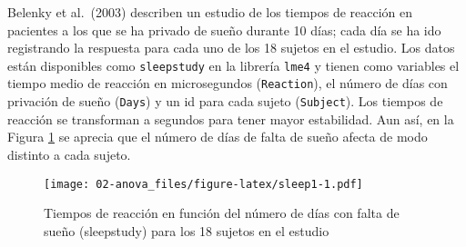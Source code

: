 \documentclass[
]{book}
\newenvironment{Shaded}{\begin{snugshade}}{\end{snugshade}}
\newcommand{\AttributeTok}[1]{\textcolor[rgb]{0.77,0.63,0.00}{#1}}
\newcommand{\CommentTok}[1]{\textcolor[rgb]{0.56,0.35,0.01}{\textit{#1}}}
\newcommand{\DecValTok}[1]{\textcolor[rgb]{0.00,0.00,0.81}{#1}}
\newcommand{\FloatTok}[1]{\textcolor[rgb]{0.00,0.00,0.81}{#1}}
\newcommand{\FunctionTok}[1]{\textcolor[rgb]{0.00,0.00,0.00}{#1}}
\newcommand{\NormalTok}[1]{#1}
\newcommand{\OtherTok}[1]{\textcolor[rgb]{0.56,0.35,0.01}{#1}}
\newcommand{\SpecialCharTok}[1]{\textcolor[rgb]{0.00,0.00,0.00}{#1}}
\newcommand{\StringTok}[1]{\textcolor[rgb]{0.31,0.60,0.02}{#1}}
\begin{document}
Belenky et al.~(2003) describen un estudio de los tiempos de reacción en pacientes a los que se ha privado de sueño durante 10 días; cada día se ha ido registrando la respuesta para cada uno de los 18 sujetos en el estudio. Los datos están disponibles como \texttt{sleepstudy} en la librería \texttt{lme4} y tienen como variables el tiempo medio de reacción en microsegundos (\texttt{Reaction}), el número de días con privación de sueño (\texttt{Days}) y un id para cada sujeto (\texttt{Subject}). Los tiempos de reacción se transforman a segundos para tener mayor estabilidad. Aun así, en la Figura \ref{fig:sleep1} se aprecia que el número de días de falta de sueño afecta de modo distinto a cada sujeto.

\begin{Shaded}
\end{Shaded}

\begin{figure}
\centering
\texttt{[image: 02-anova\_files/figure-latex/sleep1-1.pdf]}
\caption{\label{fig:sleep1}Tiempos de reacción en función del número de días con falta de sueño (sleepstudy) para los 18 sujetos en el estudio}
\end{figure}
\end{document}
